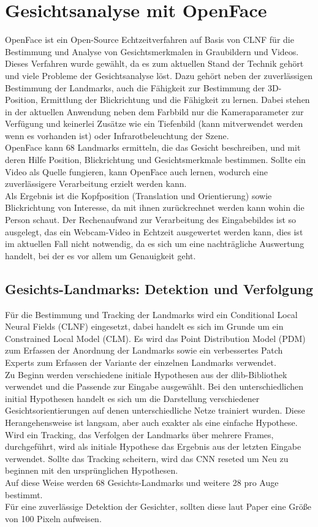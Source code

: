 \section{Gesichtsanalyse mit OpenFace}
\label{OpenFace}
OpenFace ist ein Open-Source Echtzeitverfahren auf Basis von CLNF für die Bestimmung und Analyse von Gesichtsmerkmalen in Graubildern und Videos. Dieses Verfahren wurde gewählt, da es zum aktuellen Stand der Technik gehört und viele Probleme der Gesichtsanalyse löst. Dazu gehört neben der zuverlässigen Bestimmung der Landmarks, auch die Fähigkeit zur Bestimmung der 3D-Position, Ermittlung der Blickrichtung und die Fähigkeit zu lernen. Dabei stehen in der aktuellen Anwendung neben dem Farbbild nur die Kameraparameter zur Verfügung und keinerlei Zusätze wie ein Tiefenbild (kann mitverwendet werden wenn es vorhanden ist) oder Infrarotbeleuchtung der Szene.\\
OpenFace kann 68 Landmarks ermitteln, die das Gesicht beschreiben, und mit deren Hilfe Position, Blickrichtung und Gesichtsmerkmale bestimmen. Sollte ein Video als Quelle fungieren, kann OpenFace auch lernen, wodurch eine zuverlässigere Verarbeitung erzielt werden kann.\\
Als Ergebnis ist die Kopfposition (Translation und Orientierung) sowie Blickrichtung von Interesse, da mit ihnen zurückrechnet werden kann wohin die Person schaut.
\newpage
Der Rechenaufwand zur Verarbeitung des Eingabebildes ist so ausgelegt, das ein Webcam-Video in Echtzeit ausgewertet werden kann, dies ist im aktuellen Fall nicht notwendig, da es sich um eine nachträgliche Auswertung handelt, bei der es vor allem um Genauigkeit geht.
\subsection{Gesichts-Landmarks: Detektion und Verfolgung}
Für die Bestimmung und Tracking der Landmarks wird ein Conditional Local Neural Fields (CLNF) eingesetzt, dabei handelt es sich im Grunde um ein Constrained Local Model (CLM). Es wird das Point Distribution Model (PDM) zum Erfassen der Anordnung der Landmarks sowie ein verbessertes Patch Experts zum Erfassen der Variante der einzelnen Landmarks verwendet.\\
Zu Beginn werden verschiedene initiale Hypothesen aus der dlib-Bibliothek verwendet und die Passende zur Eingabe ausgewählt. Bei den unterschiedlichen initial Hypothesen handelt es sich um die Darstellung verschiedener Gesichtsorientierungen auf denen unterschiedliche Netze trainiert wurden. Diese Herangehensweise ist langsam, aber auch exakter als eine einfache Hypothese. Wird ein Tracking, das Verfolgen der Landmarks über mehrere Frames, durchgeführt, wird als initiale Hypothese das Ergebnis aus der letzten Eingabe verwendet. Sollte das Tracking scheitern, wird das CNN reseted um Neu zu beginnen mit den ursprünglichen Hypothesen.\\
Auf diese Weise werden 68 Gesichts-Landmarks und weitere 28 pro Auge bestimmt.\\
Für eine zuverlässige Detektion der Gesichter, sollten diese laut Paper \cite{OpenFace} eine Größe von 100 Pixeln aufweisen.
